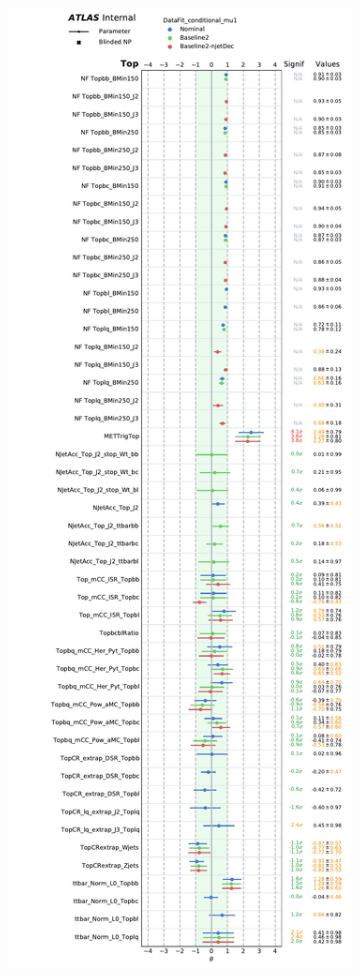 \begin{figure}[h!]
\vspace{-1.4cm}
\centering
\begin{subfigure}[b]{0.49\textwidth}
\includegraphics[scale=0.43]{Images/VH/clean_pull/NP_Top.pdf}

\end{subfigure}
\end{figure}
